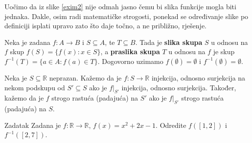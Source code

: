 \begin{remark}
Uočimo da iz slike \ref{exim2} nije odmah jasno čemu bi slika funkcije mogla biti jednaka. Dakle, osim radi matematičke strogosti, ponekad se određivanje slike po definiciji isplati upravo zato što daje točno, a ne približno, rješenje.
\end{remark}
\newpage
\begin{definition}
Neka je zadana \(f : A\to B\) i \(S\subseteq A\), te \(T\subseteq B\). Tada je \textbf{slika skupa} \(S\) u odnosu na \(f\) skup \(f(S)=\{f(x) : x\in S\}\), a \textbf{praslika skupa} \(T\) u odnosu na \(f\) je skup \(f^{-1}(T)=\{a\in A : f(a)\in T\}\). Dogovorno uzimamo \(f(\emptyset)=\emptyset\) i \(f^{-1}(\emptyset)=\emptyset\).
\end{definition}
\begin{definition}
Neka je \(S\subseteq \mathbb{R}\) neprazan. Kažemo da je \(f : S\to \mathbb{R}\) injekcija, odnosno surjekcija na nekom podskupu od \(S'\subseteq S\) ako je \(f|_{S'}\) injekcija, odnosno surjekcija. Također, kažemo da je \(f\) strogo rastuća (padajuća) na \(S'\) ako je \(f|_{S'}\) strogo rastuća (padajuća) na \(S\).
\end{definition}
\begin{exercise}{Zadatak}
Zadana je \(f : \mathbb{R}\to \mathbb{R}\), \(f(x)=x^2+2x-1\). Odredite \(f\left(\left[1, 2\right]\right)\) i \(f^{-1}\left(\left[2, 7\right]\right)\).
\end{exercise}

